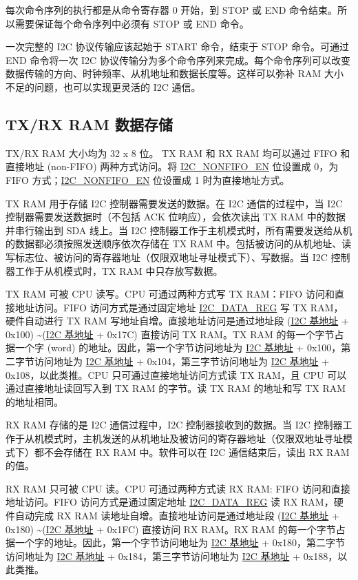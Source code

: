 \documentclass[main\_\_CN.tex]{subfiles}
\begin{document}
每次命令序列的执行都是从命令寄存器 0 开始，到 STOP 或 END 命令结束。所以需要保证每个命令序列中必须有 STOP 或 END 命令。

一次完整的 I2C 协议传输应该起始于 START 命令，结束于 STOP 命令。可通过 END 命令将一次 I2C 协议传输分为多个命令序列来完成。每个命令序列可以改变数据传输的方向、时钟频率、从机地址和数据长度等。这样可以弥补 RAM 大小不足的问题，也可以实现更灵活的 I2C 通信。

\subsection{TX/RX RAM 数据存储}
\label{subsubsec:i2c-txrx}

TX/RX RAM 大小均为 32 x 8 位。 TX RAM 和 RX RAM 均可以通过 FIFO 和直接地址 (non-FIFO) 两种方式访问。将 \hyperref[fielddesc:I2CNONFIFOEN]{I2C\_NONFIFO\_EN} 位设置成 0，为 FIFO 方式；\hyperref[fielddesc:I2CNONFIFOEN]{I2C\_NONFIFO\_EN} 位设置成 1 时为直接地址方式。

TX RAM 用于存储 I2C 控制器需要发送的数据。在 I2C 通信的过程中，当 I2C 控制器需要发送数据时（不包括 ACK 位响应），会依次读出 TX RAM 中的数据并串行输出到 SDA 线上。当 I2C 控制器工作于主机模式时，所有需要发送给从机的数据都必须按照发送顺序依次存储在 TX RAM 中。包括被访问的从机地址、读写标志位、被访问的寄存器地址（仅限双地址寻址模式下）、写数据。当 I2C 控制器工作于从机模式时，TX RAM 中只存放写数据。

TX RAM 可被 CPU 读写。CPU 可通过两种方式写 TX RAM：FIFO 访问和直接地址访问。FIFO 访问方式是通过固定地址 \hyperref[regdesc:I2CDATAREG]{I2C\_DATA\_REG} 写 TX RAM，硬件自动进行 TX RAM 写地址自增。直接地址访问是通过地址段 (\hyperref[tab:sysmem-base-address]{I2C 基地址} + 0x100) \textasciitilde (\hyperref[tab:sysmem-base-address]{I2C 基地址} + 0x17C) 直接访问 TX RAM。TX RAM 的每一个字节占据一个字 (word) 的地址。因此，第一个字节访问地址为 \hyperref[tab:sysmem-base-address]{I2C 基地址} + 0x100，第二字节访问地址为 \hyperref[tab:sysmem-base-address]{I2C 基地址} + 0x104，第三字节访问地址为 \hyperref[tab:sysmem-base-address]{I2C 基地址} + 0x108，以此类推。CPU 只可通过直接地址访问方式读 TX RAM，且 CPU 可以通过直接地址读回写入到 TX RAM 的字节。读 TX RAM 的地址和写 TX RAM 的地址相同。

RX RAM 存储的是 I2C 通信过程中，I2C 控制器接收到的数据。当 I2C 控制器工作于从机模式时，主机发送的从机地址及被访问的寄存器地址（仅限双地址寻址模式下）都不会存储在 RX RAM 中。软件可以在 I2C 通信结束后，读出 RX RAM 的值。

RX RAM 只可被 CPU 读。CPU 可通过两种方式读 RX RAM: FIFO 访问和直接地址访问。FIFO 访问方式是通过固定地址 \hyperref[regdesc:I2CDATAREG]{I2C\_DATA\_REG} 读 RX RAM，硬件自动完成 RX RAM 读地址自增。直接地址访问是通过地址段 (\hyperref[tab:sysmem-base-address]{I2C 基地址} + 0x180) \textasciitilde (\hyperref[tab:sysmem-base-address]{I2C 基地址} + 0x1FC) 直接访问 RX RAM。RX RAM 的每一个字节占据一个字的地址。因此，第一个字节访问地址为 \hyperref[tab:sysmem-base-address]{I2C 基地址} + 0x180，第二字节访问地址为 \hyperref[tab:sysmem-base-address]{I2C 基地址} + 0x184，第三字节访问地址为 \hyperref[tab:sysmem-base-address]{I2C 基地址} + 0x188，以此类推。
\end{document}
